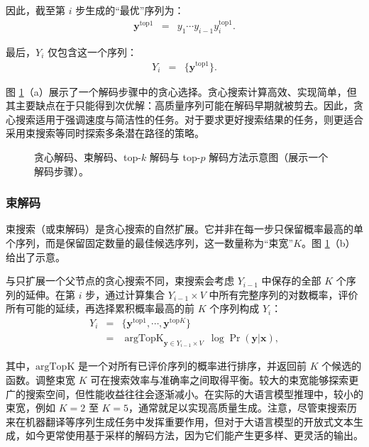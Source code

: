 因此，截至第 $i$ 步生成的“最优”序列为：
\begin{eqnarray}
\mathbf{y}^{\mathrm{top}1} & = & y_1\cdots y_{i-1} y_i^{\mathrm{top}1}.
\end{eqnarray}

最后，$Y_i$ 仅包含这一个序列：
\begin{eqnarray}
Y_i & = & \{\mathbf{y}^{\mathrm{top}1}\}.
\end{eqnarray}

图 \ref{fig:llm-decoding-methods}（a）展示了一个解码步骤中的贪心选择。贪心搜索计算高效、实现简单，但其主要缺点在于只能得到次优解：高质量序列可能在解码早期就被剪去。因此，贪心搜索适用于强调速度与简洁性的任务。对于要求更好搜索结果的任务，则更适合采用束搜索等同时探索多条潜在路径的策略。

\begin{figure}[!t]
\centering

\vspace{-0.5cm} \caption{贪心解码、束解码、top-$k$ 解码与 top-$p$ 解码方法示意图（展示一个解码步骤）。}
\label{fig:llm-decoding-methods}
\end{figure}

\subsubsection{束解码}

束搜索（或束解码）是贪心搜索的自然扩展。它并非在每一步只保留概率最高的单个序列，而是保留固定数量的最佳候选序列，这一数量称为“束宽”$K$。图 \ref{fig:llm-decoding-methods}（b）给出了示意。

与只扩展一个父节点的贪心搜索不同，束搜索会考虑 $Y_{i-1}$ 中保存的全部 $K$ 个序列的延伸。在第 $i$ 步，通过计算集合 $Y_{i-1} \times V$ 中所有完整序列的对数概率，评价所有可能的延续，再选择累积概率最高的前 $K$ 个序列构成 $Y_i$：
\begin{eqnarray}
Y_i & = & \{\mathbf{y}^{\mathrm{top}1},\cdots,\mathbf{y}^{\mathrm{top}K}\} \nonumber \\
    & = & \mathop{\mathrm{argTopK}}_{\mathbf{y} \in Y_{i-1} \times V}\ \log \Pr(\mathbf{y}|\mathbf{x}), \label{eq:llm-beam-search-k-best}
\end{eqnarray}

\noindent 其中，$\mathrm{argTopK}$ 是一个对所有已评价序列的概率进行排序，并返回前 $K$ 个候选的函数。调整束宽 $K$ 可在搜索效率与准确率之间取得平衡。较大的束宽能够探索更广的搜索空间，但性能收益往往会逐渐减小。在实际的大语言模型推理中，较小的束宽，例如 $K=2$ 至 $K=5$，通常就足以实现高质量生成。注意，尽管束搜索历来在机器翻译等序列生成任务中发挥重要作用，但对于大语言模型的开放式文本生成，如今更常使用基于采样的解码方法，因为它们能产生更多样、更灵活的输出。

